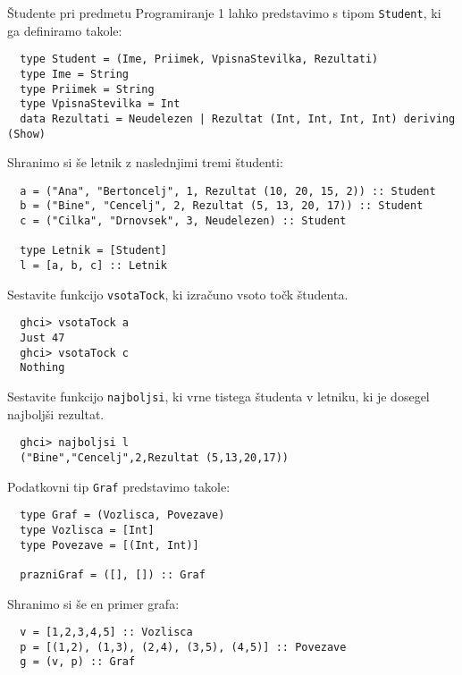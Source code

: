 \documentclass[arhiv]{../izpit}
\begin{document}


Študente pri predmetu Programiranje 1 lahko predstavimo s 
tipom \texttt{Student}, ki ga definiramo takole:
\begin{verbatim}
  type Student = (Ime, Priimek, VpisnaStevilka, Rezultati)
  type Ime = String
  type Priimek = String
  type VpisnaStevilka = Int
  data Rezultati = Neudelezen | Rezultat (Int, Int, Int, Int) deriving (Show)
\end{verbatim}

Shranimo si še letnik z naslednjimi tremi študenti:
\begin{verbatim}
  a = ("Ana", "Bertoncelj", 1, Rezultat (10, 20, 15, 2)) :: Student
  b = ("Bine", "Cencelj", 2, Rezultat (5, 13, 20, 17)) :: Student
  c = ("Cilka", "Drnovsek", 3, Neudelezen) :: Student
  
  type Letnik = [Student]
  l = [a, b, c] :: Letnik
\end{verbatim}

\podnaloga
  Sestavite funkcijo \texttt{vsotaTock}, ki izračuno vsoto točk študenta.
  \begin{verbatim}
  ghci> vsotaTock a
  Just 47
  ghci> vsotaTock c
  Nothing
  \end{verbatim}

\podnaloga
  Sestavite funkcijo \texttt{najboljsi}, ki vrne tistega študenta v letniku, ki je dosegel najboljši rezultat.
  \begin{verbatim}
  ghci> najboljsi l
  ("Bine","Cencelj",2,Rezultat (5,13,20,17))
  \end{verbatim}



Podatkovni tip \texttt{Graf} predstavimo takole:

  \begin{verbatim}
  type Graf = (Vozlisca, Povezave)
  type Vozlisca = [Int]
  type Povezave = [(Int, Int)]

  prazniGraf = ([], []) :: Graf
  \end{verbatim}

Shranimo si še en primer grafa:
  \begin{verbatim}
  v = [1,2,3,4,5] :: Vozlisca
  p = [(1,2), (1,3), (2,4), (3,5), (4,5)] :: Povezave
  g = (v, p) :: Graf
  \end{verbatim}
\end{document}
